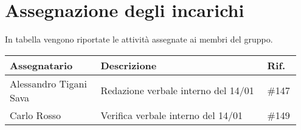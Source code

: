 \section{Assegnazione degli incarichi}
In tabella vengono riportate le attività assegnate ai membri del gruppo.
\begin{center}
	{
		\renewcommand{\arraystretch}{1.5}
		\begin{tabular}{p{0.30\linewidth}|p{0.55\linewidth}|p{0.10\linewidth}}
			\textbf{Assegnatario}             	& \textbf{Descrizione}					& \textbf{Rif.} \\
			\hline
			Alessandro Tigani Sava            	& Redazione verbale interno del 14/01	& \#147	\\
			\hline
			Carlo Rosso                       	& Verifica verbale interno del 14/01	& \#149	\\
			\hline
		\end{tabular}
	}
\end{center}
